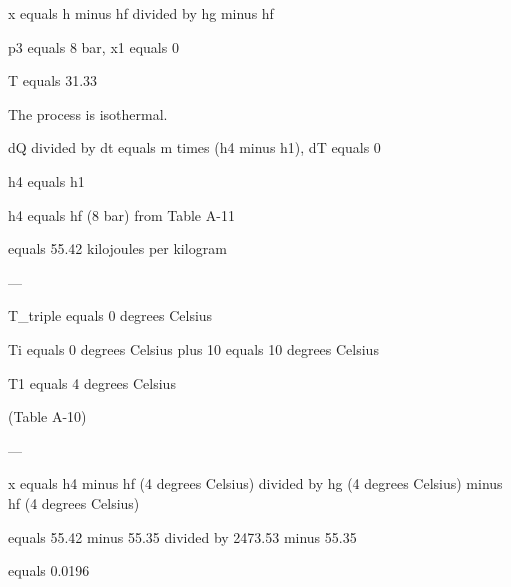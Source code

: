 x equals h minus hf divided by hg minus hf  

p3 equals 8 bar, x1 equals 0  

T equals 31.33  

The process is isothermal.  

dQ divided by dt equals m times (h4 minus h1), dT equals 0  

h4 equals h1  

h4 equals hf (8 bar) from Table A-11  

equals 55.42 kilojoules per kilogram  

---

T_triple equals 0 degrees Celsius  

Ti equals 0 degrees Celsius plus 10 equals 10 degrees Celsius  

T1 equals 4 degrees Celsius  

(Table A-10)  

---

x equals h4 minus hf (4 degrees Celsius) divided by hg (4 degrees Celsius) minus hf (4 degrees Celsius)  

equals 55.42 minus 55.35 divided by 2473.53 minus 55.35  

equals 0.0196